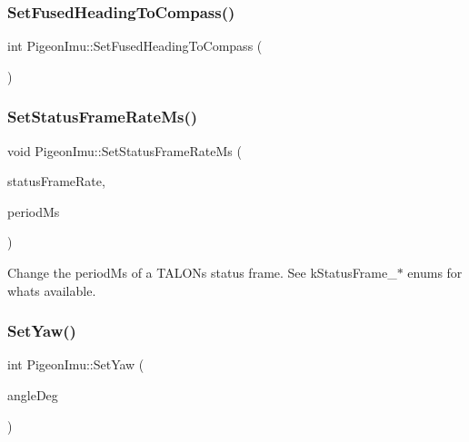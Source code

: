 \mbox{\label{class_pigeon_imu_a1c26ba00bce3ddddf3b15b464048debf}} 
\subsubsection{\texorpdfstring{Set\+Fused\+Heading\+To\+Compass()}{SetFusedHeadingToCompass()}}
{\footnotesize\ttfamily int Pigeon\+Imu\+::\+Set\+Fused\+Heading\+To\+Compass (\begin{DoxyParamCaption}{ }\end{DoxyParamCaption})}

\mbox{\label{class_pigeon_imu_a44dd2494ea4902480eaab3e9bfe01168}} 
\subsubsection{\texorpdfstring{Set\+Status\+Frame\+Rate\+Ms()}{SetStatusFrameRateMs()}}
{\footnotesize\ttfamily void Pigeon\+Imu\+::\+Set\+Status\+Frame\+Rate\+Ms (\begin{DoxyParamCaption}\item[{\hyperlink{class_pigeon_imu_a655b831f9be6c185f1cc553679776b31}{Status\+Frame\+Rate}}]{status\+Frame\+Rate,  }\item[{int}]{period\+Ms }\end{DoxyParamCaption})}

Change the period\+Ms of a T\+A\+L\+ON\textquotesingle{}s status frame. See k\+Status\+Frame\+\_\+$\ast$ enums for what\textquotesingle{}s available. \mbox{\label{class_pigeon_imu_aeebdd0e34a7542d5155e72fe673f97f2}} 
\subsubsection{\texorpdfstring{Set\+Yaw()}{SetYaw()}}
{\footnotesize\ttfamily int Pigeon\+Imu\+::\+Set\+Yaw (\begin{DoxyParamCaption}\item[{double}]{angle\+Deg }\end{DoxyParamCaption})}

